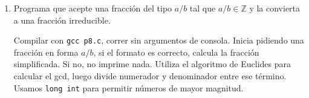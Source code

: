 \documentclass{article}
\newcommand{\Z}{{\mathbb Z}}
\begin{document}
\begin{enumerate}
		
		\vspace{12pt}
		
		
		
		\item Programa que acepte una fracci\'on del tipo $a/b$ tal que $a/b\in \Z$ y la convierta a una fracci\'on irreducible.
		\begin{mdframed}[
			linecolor=darkgray,
			backgroundcolor=pearl]
			Compilar con \texttt{gcc p8.c}, correr sin argumentos de consola. Inicia pidiendo una fracci\'on en forma $a/b$, si el formato es correcto, calcula la fracci\'on simplificada. Si no, no imprime nada. Utiliza el algoritmo de Euclides para calcular el gcd, luego divide numerador y denominador entre ese t\'ermino. Usamos \texttt{long int} para permitir n\'umeros de mayor magnitud.  
			
		\end{mdframed}
	\end{enumerate}
	
	
	
	
\end{document}
